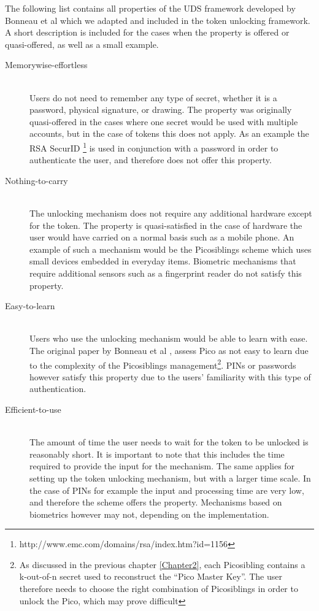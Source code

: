 The following list contains all properties of the UDS framework developed by Bonneau et al \cite{bonneau2012quest} which we adapted and included in the token unlocking framework. A short description is included for the cases when the property is offered or quasi-offered, as well as a small example.
\begin{description}
  
  \item[Memorywise-effortless] \hfill \\
  Users do not need to remember any type of secret, whether it is a password, physical signature, or drawing. The property was originally quasi-offered in the cases where one secret would be used with multiple accounts, but in the case of tokens this does not apply. As an example the RSA SecurID \footnote{http://www.emc.com/domains/rsa/index.htm?id=1156} is used in conjunction with a password in order to authenticate the user, and therefore does not offer this property.
  
  \item[Nothing-to-carry] \hfill \\
  The unlocking mechanism does not require any additional hardware except for the token. The property is quasi-satisfied in the case of hardware the user would have carried on a normal basis such as a mobile phone. An example of such a mechanism would be the Picosiblings scheme which uses small devices embedded in everyday items. Biometric mechanisms that require additional sensors such as a fingerprint reader do not satisfy this property. 
  
  \item[Easy-to-learn] \hfill \\
  Users who use the unlocking mechanism would be able to learn with ease. The original paper by Bonneau et al \cite{bonneau2012quest}, assess Pico as not easy to learn due to the complexity of the Picosiblings management\footnote{As discussed in the previous chapter \ref{Chapter2}, each Picosibling contains a k-out-of-n secret used to reconstruct the ``Pico Master Key''. The user therefore needs to choose the right combination of Picosiblings in order to unlock the Pico, which may prove difficult}. PINs or passwords however satisfy this property due to the users' familiarity with this type of authentication.
  
  \item[Efficient-to-use] \hfill \\
  The amount of time the user needs to wait for the token to be unlocked is reasonably short. It is important to note that this includes the time required to provide the input for the mechanism. The same applies for setting up the token unlocking mechanism, but with a larger time scale. In the case of PINs for example the input and processing time are very low, and therefore the scheme offers the property. Mechanisms based on biometrics however may not, depending on the implementation.
  

\end{description}
